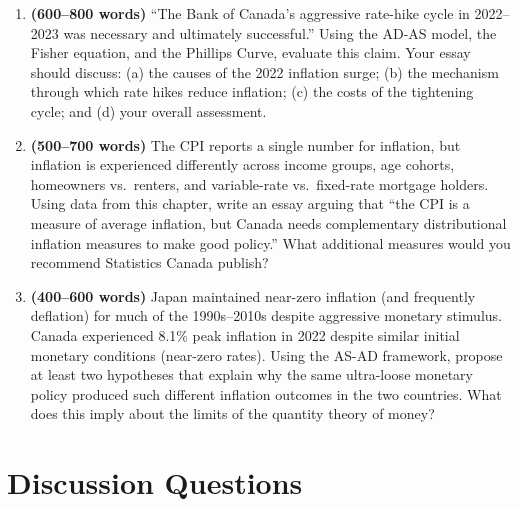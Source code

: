 \begin{enumerate}

\item \textbf{(600--800 words)} ``The Bank of Canada's aggressive rate-hike
cycle in 2022--2023 was necessary and ultimately successful.'' Using the
AD-AS model, the Fisher equation, and the Phillips Curve, evaluate this
claim. Your essay should discuss: (a) the causes of the 2022 inflation surge;
(b) the mechanism through which rate hikes reduce inflation; (c) the costs
of the tightening cycle; and (d) your overall assessment.

\item \textbf{(500--700 words)} The CPI reports a single number for inflation,
but inflation is experienced differently across income groups, age cohorts,
homeowners vs.\ renters, and variable-rate vs.\ fixed-rate mortgage holders.
Using data from this chapter, write an essay arguing that ``the CPI is a
measure of average inflation, but Canada needs complementary distributional
inflation measures to make good policy.'' What additional measures would you
recommend Statistics Canada publish?

\item \textbf{(400--600 words)} Japan maintained near-zero inflation (and
frequently deflation) for much of the 1990s--2010s despite aggressive monetary
stimulus. Canada experienced 8.1\% peak inflation in 2022 despite similar
initial monetary conditions (near-zero rates). Using the AS-AD framework,
propose at least two hypotheses that explain why the same ultra-loose monetary
policy produced such different inflation outcomes in the two countries. What
does this imply about the limits of the quantity theory of money?

\end{enumerate}

\section*{Discussion Questions}

